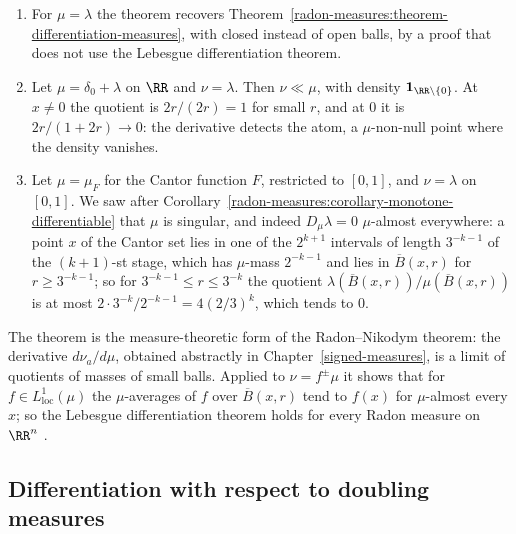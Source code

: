 \begin{example}\label{radon-measures:example-besicovitch-differentiation}
\begin{enumerate}
\item For $\mu = \lambda$ the theorem recovers Theorem~\ref{radon-measures:theorem-differentiation-measures}, with closed instead of open balls, by a proof that does not use the Lebesgue differentiation
theorem.
\item Let $\mu = \delta_0 + \lambda$ on $\RR$ and $\nu = \lambda$. Then $\nu \ll \mu$, with density $\mathbf{1}_{\RR \setminus \{0\}}$. At $x \neq 0$ the quotient is $2r/(2r) = 1$ for small $r$, and at $0$ it
is $2r/(1 + 2r) \to 0$: the derivative detects the atom, a $\mu$-non-null point where the density vanishes.
\item Let $\mu = \mu_F$ for the Cantor function $F$, restricted to $[0, 1]$, and $\nu = \lambda$ on $[0, 1]$. We saw after Corollary~\ref{radon-measures:corollary-monotone-differentiable} that $\mu$ is singular,
and indeed $D_\mu\lambda = 0$ $\mu$-almost everywhere: a point $x$ of the Cantor set lies in one of the $2^{k+1}$ intervals of length $3^{-k-1}$ of the $(k+1)$-st stage, which has $\mu$-mass $2^{-k-1}$ and lies in
$\overline{B}(x, r)$ for $r \geq 3^{-k-1}$; so for $3^{-k-1} \leq r \leq 3^{-k}$ the quotient $\lambda(\overline{B}(x, r))/\mu(\overline{B}(x, r))$ is at most $2\cdot3^{-k}/2^{-k-1} = 4(2/3)^k$, which tends to $0$.
\end{enumerate}
\end{example}

The theorem is the measure-theoretic form of the Radon--Nikodym theorem: the derivative $d\nu_a/d\mu$, obtained abstractly in Chapter~\ref{signed-measures}, is a limit of quotients of masses of small
balls. Applied to $\nu = f^{\pm}\mu$ it shows that for $f \in L^1_{\mathrm{loc}}(\mu)$ the $\mu$-averages of $f$ over $\overline{B}(x, r)$ tend to $f(x)$ for $\mu$-almost every $x$; so the Lebesgue
differentiation theorem holds for every Radon measure on $\RR^n$ \cite[Section 1.7]{evans-gariepy}.

\subsection{Differentiation with respect to doubling measures}\label{radon-measures:subsection-doubling}

